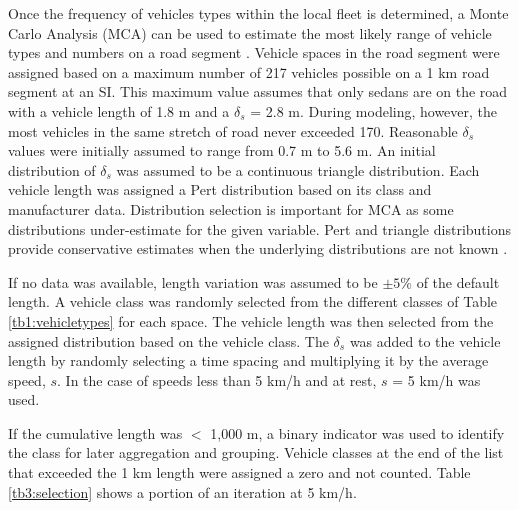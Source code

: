 \documentclass[preprint,12pt,a4paper]{elsarticle}
\begin{document}
\begin{linenumbers}
Once the frequency of vehicles types within the local fleet is determined, a Monte Carlo Analysis (MCA) can be used to estimate the most likely range of vehicle types and numbers on a road segment \citep{Freeman2015b}. Vehicle spaces in the road segment were assigned based on a maximum number of 217 vehicles possible on a 1 km road segment at an SI.  This maximum value assumes that only sedans are on the road with a vehicle length of 1.8 m and a $\delta_{s}$ = 2.8 m.  During modeling, however, the most vehicles in the same stretch of road never exceeded 170.  Reasonable $\delta_{s}$ values were initially assumed to range from 0.7 m to 5.6 m. An initial distribution of $\delta_{s}$ was assumed to be a continuous triangle distribution. Each vehicle length was assigned a Pert distribution based on its class and manufacturer data. Distribution selection is important for MCA as some distributions under-estimate for the given variable. Pert and triangle distributions provide conservative estimates when the underlying distributions are not known \citep{Freeman2018}. 

If no data was available, length variation was assumed to be $\pm5\%$ of the default length. A vehicle class was randomly selected from the different classes of Table \ref{tb1:vehicletypes} for each space.  The vehicle length was then selected from the assigned distribution based on the vehicle class.  The $\delta_{s}$ was added to the vehicle length by randomly selecting a time spacing and multiplying it by the average speed, $s$. In the case of speeds less than 5 km/h and at rest, $s$ = 5 km/h was used.  

If the cumulative length was $<$ 1,000 m, a binary indicator was used to identify the class for later aggregation and grouping.  Vehicle classes at the end of the list that exceeded the 1 km length were assigned a zero and not counted.  Table \ref{tb3:selection} shows a portion of an iteration at 5 km/h. 


\end{linenumbers}
\end{document}
